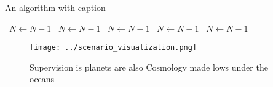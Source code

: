 \documentclass[a4paper]{article}
\begin{document}
\begin{algorithm}
\caption{An algorithm with caption}
\begin{algorithmic}
\    \State $N \gets N - 1$
\    \State $N \gets N - 1$
\    \State $N \gets N - 1$
\    \State $N \gets N - 1$
\    \State $N \gets N - 1$
\EndWhile
\end{algorithmic}
\end{algorithm}

\begin{figure}
\centering
\texttt{[image: ../scenario\_visualization.png]}
\caption{Supervision is planets are also Cosmology made lows under the oceans 
}
\end{figure}
 
\end{document}
